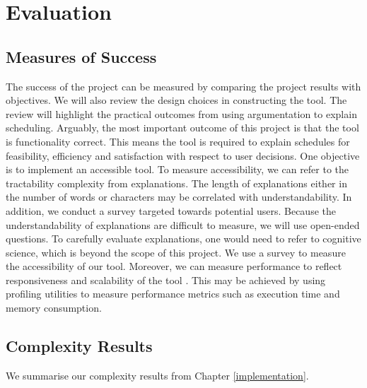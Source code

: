 \chapter{Evaluation}

\section{Measures of Success}

The success of the project can be measured by comparing the project results with objectives. We will also review the design choices in constructing the tool. The review will highlight the practical outcomes from using argumentation to explain scheduling.
\linespace
Arguably, the most important outcome of this project is that the tool is functionality correct. This means the tool is required to explain schedules for feasibility, efficiency and satisfaction with respect to user decisions.
\linespace
One objective is to implement an accessible tool. To measure accessibility, we can refer to the tractability complexity from explanations. The length of explanations either in the number of words or characters may be correlated with understandability. In addition, we conduct a survey targeted towards potential users. Because the understandability of explanations are difficult to measure, we will use open-ended questions. To carefully evaluate explanations, one would need to refer to cognitive science, which is beyond the scope of this project. We use a survey to measure the accessibility of our tool. Moreover, we can measure performance to reflect responsiveness and scalability of the tool \cite{foundationimplementation}. This may be achieved by using profiling utilities to measure performance metrics such as execution time and memory consumption. 

\section{Complexity Results}

We summarise our complexity results from Chapter \ref{implementation}.

